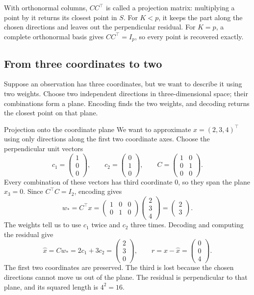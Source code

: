 \documentclass[a4paper,12pt,oneside]{report}
\begin{document}
With orthonormal columns, $CC^\top$ is called a projection matrix:
multiplying a point by it returns its closest point in $S$.
For $K<p$, it keeps the part along the chosen directions and leaves
out the perpendicular residual. For $K=p$, a complete orthonormal
basis gives $CC^\top=I_p$, so every point is recovered exactly.

\subsection{From three coordinates to two}

Suppose an observation has three coordinates, but we want to describe
it using two weights. Choose two independent directions in three-dimensional
space; their combinations form a plane. Encoding finds the two
weights, and decoding returns the closest point on that plane.

\begin{framedexample}{Projection onto the coordinate plane}
We want to approximate $x=(2,3,4)^\top$ using only directions along
the first two coordinate axes. Choose the perpendicular unit vectors
\[
  c_1=\begin{pmatrix}1\\0\\0\end{pmatrix},\qquad
  c_2=\begin{pmatrix}0\\1\\0\end{pmatrix},\qquad
  C=\begin{pmatrix}1&0\\0&1\\0&0\end{pmatrix}.
\]
Every combination of these vectors has third coordinate $0$, so
they span the plane $x_3=0$. Since $C^\top C=I_2$, encoding gives
\[
  w_*=C^\top x
      =\begin{pmatrix}1&0&0\\0&1&0\end{pmatrix}
       \begin{pmatrix}2\\3\\4\end{pmatrix}
      =\begin{pmatrix}2\\3\end{pmatrix}.
\]
The weights tell us to use $c_1$ twice and $c_2$ three times.
Decoding and computing the residual give
\[
  \hat{x}=Cw_*=2c_1+3c_2=\begin{pmatrix}2\\3\\0\end{pmatrix},\qquad
  r=x-\hat{x}=\begin{pmatrix}0\\0\\4\end{pmatrix}.
\]
The first two coordinates are preserved. The third is lost because
the chosen directions cannot move us out of the plane. The residual
is perpendicular to that plane, and its squared length is $4^2=16$.
\end{framedexample}
\end{document}

